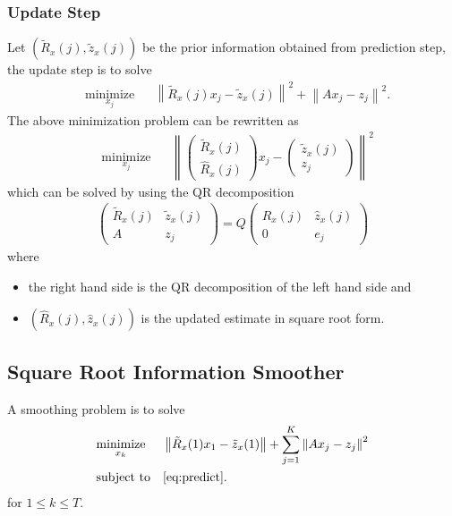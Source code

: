 \documentclass[microtype]{gtpart}     %
\theoremstyle{definition}
\newcommand{\norm}[1]{\left\lVert#1\right\rVert}
\begin{document}
\subsubsection{Update Step}

Let $(\tilde{R}_x(j), \tilde{z}_x(j))$ be the prior information obtained from prediction step, 
the update step is to solve
\begin{align*}
	& \underset{x_j}{\text{minimize}} & &\norm{\tilde{R}_x(j)x_j - \tilde{z}_x(j)}^2 + \norm{Ax_j - z_j}^2.
\end{align*}
The above minimization problem can be rewritten as
\begin{align*}
	& \underset{x_j}{\text{minimize}} & &\norm{
	\begin{pmatrix}
	\tilde{R}_x(j) \\ \hat{R}_x(j)
	\end{pmatrix}x_j - 
	\begin{pmatrix}
	\tilde{z}_x(j) \\  z_j
	\end{pmatrix}}^2
\end{align*}
which can be solved by using the QR decomposition
\begin{align*}
	\begin{pmatrix}
		\tilde{R}_x(j) &\tilde{z}_x(j) \\ 
		A &z_j
	\end{pmatrix} = Q
	\begin{pmatrix}
		\hat{R}_x(j) &\hat{z}_x(j) \\
		0 &e_j
	\end{pmatrix}
\end{align*}
where
\begin{itemize}
	\item the right hand side is the QR decomposition of the left hand side and
	\item $(\hat{R}_x(j), \hat{z}_x(j))$ is the updated estimate in square root form.
\end{itemize}

\subsection{Square Root Information Smoother}

A smoothing problem is to solve
\begin{align*}
& \underset{x_k}{\text{minimize}} & & \norm{\tilde{R}_x(1)x_1 - \tilde{z}_x(1)} + \sum_{j=1}^{K}\norm{Ax_j - z_j}^2 \\
& \text{subject to} & & \autoref{eq:predict}.
\end{align*}
for $1\leq k \leq T$.
\end{document}
